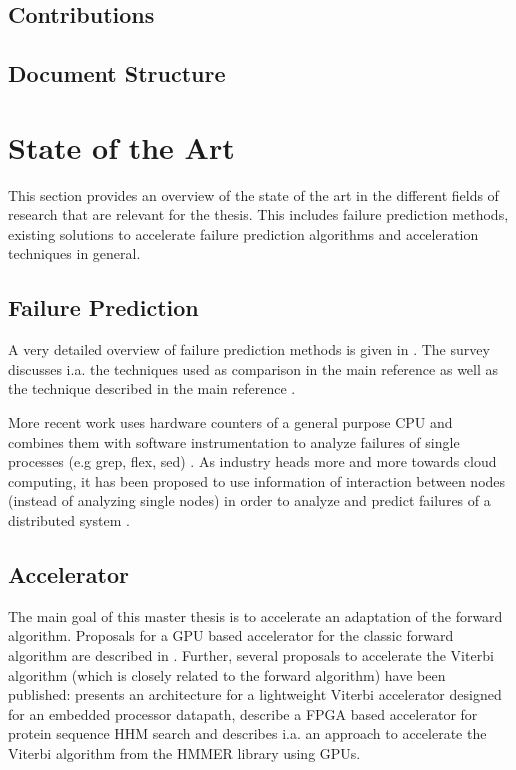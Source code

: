 \documentclass[mscthesis]{usiinfthesis}
\begin{document}
\section{Contributions}
\label{ch:intro_cont}
\section{Document Structure}
\label{ch:intro_struct}

\chapter{State of the Art}
\label{ch:art}
This section provides an overview of the state of the art in the different
fields of research that are relevant for the thesis. This includes failure
prediction methods, existing solutions to accelerate failure prediction
algorithms and acceleration techniques in general.

\section{Failure Prediction}
\label{ch:art_pred}
A very detailed overview of failure prediction methods is given in
\cite{ACM10_Salfner}. The survey discusses i.a. the techniques used as
comparison in the main reference
\cite{lin88,IEEE90_lin,ICDM02_Vilalta,domeniconi02} as well as the technique
described in the main reference \cite{salfner08}.

More recent work uses hardware counters of a general purpose CPU and combines
them with software instrumentation to analyze failures of single processes (e.g
grep, flex, sed) \cite{FSE10_Yilmaz}. As industry heads more and more
towards cloud computing, it has been proposed to use information of interaction
between nodes (instead of analyzing single nodes) in order to analyze and
predict failures of a distributed system \cite{IEEE12_Salfner,DSN10_Oliner}.
\section{Accelerator}
\label{ch:art_acc}
The main goal of this master thesis is to accelerate an adaptation of the
forward algorithm. Proposals for a GPU based accelerator for the classic
forward algorithm are described in \cite{neumann11,liu09}. Further, several
proposals to accelerate the Viterbi algorithm (which is closely related to the
forward algorithm) have been published: \cite{ASAP12_Azhar} presents an
architecture for a lightweight Viterbi accelerator designed for an embedded
processor datapath, \cite{IPDPS07_Jacob,ICS06_Maddimsetty,IPDPS07_Oliver}
describe a FPGA based accelerator for protein sequence HHM search and
\cite{IPDPS09_Walters} describes i.a. an approach to accelerate the Viterbi
algorithm from the HMMER library using GPUs.
\end{document}
